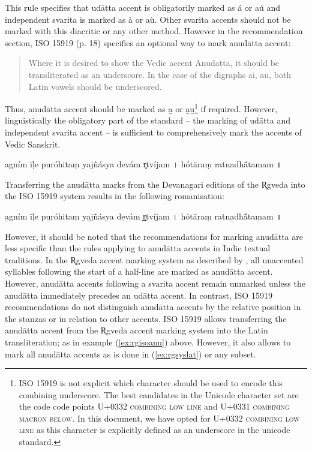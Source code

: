 This rule specifies that udātta accent is obligatorily marked as á or aú and independent svarita is marked as à or aù. Other svarita accents should not be marked with this diacritic or any other method. However in the recommendation section, ISO 15919 (p. 18) specifies an optional way to mark anudātta accent:

\begin{quote}Where it is desired to show the Vedic accent Anudatta, it should be transliterated as an underscore. In the case of the digraphs ai, au, both Latin vowels should be underscored.\end{quote}

Thus, anudātta accent should be marked as a̲ or a̲u̲\footnote{ISO 15919 is not explicit which character should be used to encode this combining underscore. The best candidates in the Unicode character set are the code code points  U+0332 \textsc{combining low line} and U+0331 \textsc{combining macron below}. In this document, we have opted for U+0332 \textsc{combining low line} as this character is explicitly defined as an underscore in the unicode standard.} if required. However, linguistically the obligatory part of the standard – the marking of udātta and independent svarita accent – is sufficient to comprehensively mark the accents of Vedic Sanskrit.

\begin{exe}
\ex\label{ex:rgnormal} agním īḷe puróhitaṃ yajñásya devám r̥tvíjam {\devfont ।} hótāraṃ ratnadhā́tamam {\devfont ॥}
\end{exe}


Transferring the anudātta marks from the Devanagari editions of the R̥gveda into the ISO 15919 system results in the following romanisation:

\begin{exe}
\ex\label{ex:rgisoanu} a̲gním īḷe pu̲róhitaṃ ya̲jñásya de̲vám r̥̲tvíjam {\devfont ।} hótāraṃ ratna̲dhā́tamam {\devfont ॥}
\end{exe}

However, it should be noted that the recommendations for marking anudātta are less specific than the rules applying to anudātta accents in Indic textual traditions. In the R̥gveda accent marking system as described by \citet[p.~449]{Macdonell1916}, all unaccented syllables following the start of a half-line are marked as anudātta accent. However, anudātta accents following a svarita accent remain unmarked unless the anudātta immediately precedes an udātta accent. In contrast, ISO 15919 recommendations do not distinguish anudātta accents by the relative position in the stanzas or in relation to other accents. ISO 15919 allows transferring the anudātta accent from the R̥gveda accent marking system into the Latin transliteration; as in example (\ref{ex:rgisoanu}) above. However, it also allows to mark all anudātta accents as is done in (\ref{ex:rgsyslat}) or any subset. 


